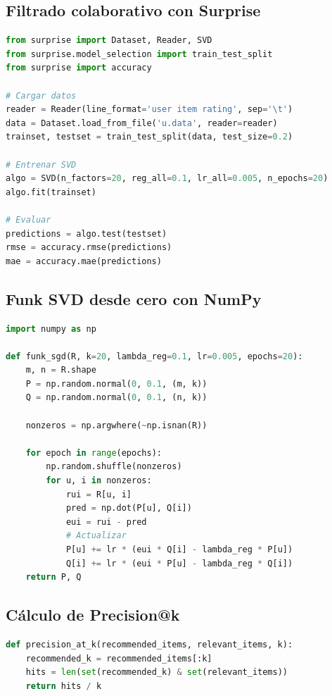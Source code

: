 \documentclass[12pt,a4paper,openany,oneside]{book}
\begin{document}
\subsection{Filtrado colaborativo con Surprise}
\begin{lstlisting}[language=Python]
from surprise import Dataset, Reader, SVD
from surprise.model_selection import train_test_split
from surprise import accuracy

# Cargar datos
reader = Reader(line_format='user item rating', sep='\t')
data = Dataset.load_from_file('u.data', reader=reader)
trainset, testset = train_test_split(data, test_size=0.2)

# Entrenar SVD
algo = SVD(n_factors=20, reg_all=0.1, lr_all=0.005, n_epochs=20)
algo.fit(trainset)

# Evaluar
predictions = algo.test(testset)
rmse = accuracy.rmse(predictions)
mae = accuracy.mae(predictions)
\end{lstlisting}

\subsection{Funk SVD desde cero con NumPy}
\begin{lstlisting}[language=Python]
import numpy as np

def funk_sgd(R, k=20, lambda_reg=0.1, lr=0.005, epochs=20):
    m, n = R.shape
    P = np.random.normal(0, 0.1, (m, k))
    Q = np.random.normal(0, 0.1, (n, k))
    
    nonzeros = np.argwhere(~np.isnan(R))
    
    for epoch in range(epochs):
        np.random.shuffle(nonzeros)
        for u, i in nonzeros:
            rui = R[u, i]
            pred = np.dot(P[u], Q[i])
            eui = rui - pred
            # Actualizar
            P[u] += lr * (eui * Q[i] - lambda_reg * P[u])
            Q[i] += lr * (eui * P[u] - lambda_reg * Q[i])
    return P, Q
\end{lstlisting}

\subsection{Cálculo de Precision@k}
\begin{lstlisting}[language=Python]
def precision_at_k(recommended_items, relevant_items, k):
    recommended_k = recommended_items[:k]
    hits = len(set(recommended_k) & set(relevant_items))
    return hits / k
\end{lstlisting}
\end{document}
